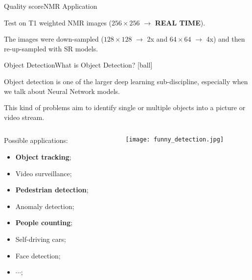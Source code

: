 \documentclass[10pt, technote, oribibl, unicode]{beamer}
\begin{document}
\begin{frame}{Quality score}{NMR Application}

  \scriptsize{Test on T1 weighted NMR images ($256\times 256$ $\rightarrow$ \textbf{REAL TIME}).}

  \scriptsize{The images were down-sampled ($128\times 128$ $\rightarrow$ 2x and $64\times 64$ $\rightarrow$ 4x) and then re-up-sampled with SR models.}

  \begin{figure}

    \begin{overprint}
      \centering\def\svgwidth{\linewidth}
      \centering\def\svgwidth{\linewidth}
    \end{overprint}

  \end{figure}

\end{frame}



\begin{frame}{Object Detection}{What is Object Detection?}
  [ball]

  \scriptsize{Object detection is one of the larger deep learning sub-discipline, especially when we talk about Neural Network models.}

  \scriptsize{This kind of problems aim to identify single or multiple objects into a picture or video stream.}

  \vspace{1cm}

  \begin{columns}
    \begin{column}{0.5\textwidth}
      \scriptsize{Possible applications:}

      \begin{itemize}
        \item \textbf{Object tracking};
        \item Video surveillance;
        \item \textbf{Pedestrian detection};
        \item Anomaly detection;
        \item \textbf{People counting};
        \item Self-driving cars;
        \item Face detection;
        \item $\cdots$;
      \end{itemize}

    \end{column}
    \begin{column}{0.5\textwidth}
      \texttt{[image: funny\_detection.jpg]}
    \end{column}
  \end{columns}
\end{frame}
\end{document}

